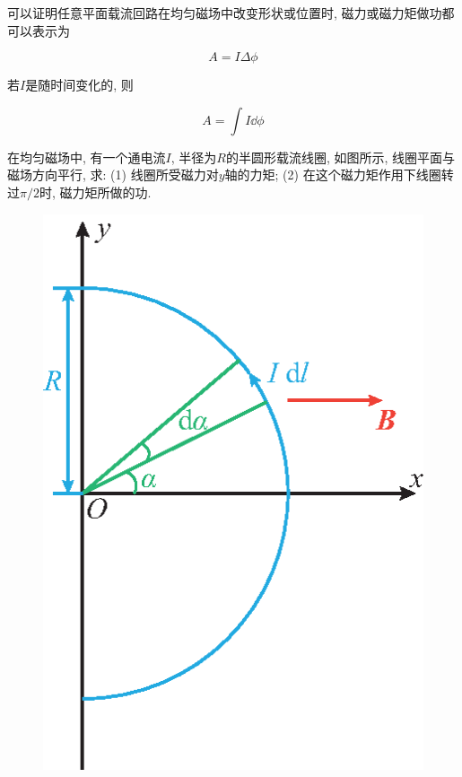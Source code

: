 \begin{enumerate}[itemindent=1em]
	可以证明任意平面载流回路在均匀磁场中改变形状或位置时, 磁力或磁力矩做功都可以表示为
	
	\begin{equation}
		A = I \Delta \phi \label{C8-eq21}
	\end{equation}
	
	若$I$是随时间变化的, 则
	
	\begin{equation}
		A = \int I \dd{\phi} \label{C8-eq22}
	\end{equation}

\end{enumerate}

\begin{example}
	在均匀磁场中, 有一个通电流$I$, 半径为$R$的半圆形载流线圈, 如图所示, 线圈平面与磁场方向平行, 求: 
	(1) 线圈所受磁力对$y$轴的力矩;
	(2) 在这个磁力矩作用下线圈转过$\pi / 2$时, 磁力矩所做的功.
	
	\begin{figure}[H]
		\centering
		\includegraphics[scale=0.8]{C8-fig20.eps}
	\end{figure}
	

\end{example}

